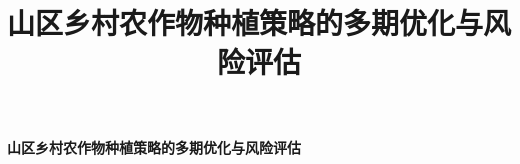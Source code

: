 \documentclass[withoutpreface,bwprint]{cumcmthesis}
\title{山区乡村农作物种植策略的多期优化与风险评估}
\begin{document}
{\centering{}\bfseries 山区乡村农作物种植策略的多期优化与风险评估\par}

\setcounter{page}{1}

\thispagestyle{empty}


\thispagestyle{empty}

\newpage

\setcounter{page}{1}



















\newpage


\newpage

\end{document}
